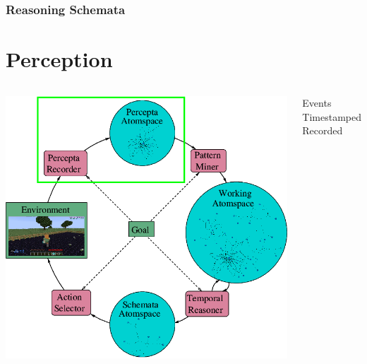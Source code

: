 \documentclass[aspectratio=169]{beamer}
\begin{document}
\begin{frame}

\end{frame}

\begin{frame}
  \frametitle{Reasoning Schemata}


\end{frame}

\section{Perception}

\begin{frame}

  \begin{columns}
    \column{3.2in}
    \includegraphics[scale=0.3]{pictures/rocca-chart-perception-highlight-v0.7.png}
    \column{2.5in}
    \begin{center}
      Events\\
      Timestamped\\
      Recorded
    \end{center}
  \end{columns}
\end{frame}
\end{document}
